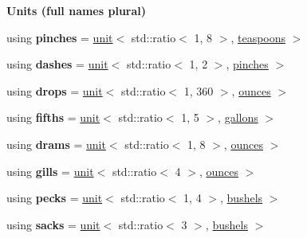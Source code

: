 \begin{Indent}{\bf Units (full names plural)}
\begin{DoxyCompactItemize}
\item 
\hypertarget{namespaceunits_1_1volume_a53a5ccb441ebec5eb3d1f1ede47b07ac}{}using {\bfseries pinches} = \hyperlink{structunits_1_1unit}{unit}$<$ std\+::ratio$<$ 1, 8 $>$, \hyperlink{structunits_1_1unit}{teaspoons} $>$\label{namespaceunits_1_1volume_a53a5ccb441ebec5eb3d1f1ede47b07ac}

\item 
\hypertarget{namespaceunits_1_1volume_a3c228a578ec1bf65da881bb35a3cde75}{}using {\bfseries dashes} = \hyperlink{structunits_1_1unit}{unit}$<$ std\+::ratio$<$ 1, 2 $>$, \hyperlink{structunits_1_1unit}{pinches} $>$\label{namespaceunits_1_1volume_a3c228a578ec1bf65da881bb35a3cde75}

\item 
\hypertarget{namespaceunits_1_1volume_a20e6934a29bbacdca7ef2802830ab91c}{}using {\bfseries drops} = \hyperlink{structunits_1_1unit}{unit}$<$ std\+::ratio$<$ 1, 360 $>$, \hyperlink{structunits_1_1unit}{ounces} $>$\label{namespaceunits_1_1volume_a20e6934a29bbacdca7ef2802830ab91c}

\item 
\hypertarget{namespaceunits_1_1volume_a561c4634b38d57cb72b90a3f431df29f}{}using {\bfseries fifths} = \hyperlink{structunits_1_1unit}{unit}$<$ std\+::ratio$<$ 1, 5 $>$, \hyperlink{structunits_1_1unit}{gallons} $>$\label{namespaceunits_1_1volume_a561c4634b38d57cb72b90a3f431df29f}

\item 
\hypertarget{namespaceunits_1_1volume_a8e55a2f0dc7dbb6e8b6f47ca93de9417}{}using {\bfseries drams} = \hyperlink{structunits_1_1unit}{unit}$<$ std\+::ratio$<$ 1, 8 $>$, \hyperlink{structunits_1_1unit}{ounces} $>$\label{namespaceunits_1_1volume_a8e55a2f0dc7dbb6e8b6f47ca93de9417}

\item 
\hypertarget{namespaceunits_1_1volume_a05e82fee9564b2b499f655bc55b321ee}{}using {\bfseries gills} = \hyperlink{structunits_1_1unit}{unit}$<$ std\+::ratio$<$ 4 $>$, \hyperlink{structunits_1_1unit}{ounces} $>$\label{namespaceunits_1_1volume_a05e82fee9564b2b499f655bc55b321ee}

\item 
\hypertarget{namespaceunits_1_1volume_ad4f7aaf17f9c4764b097e4e6c9e4e72d}{}using {\bfseries pecks} = \hyperlink{structunits_1_1unit}{unit}$<$ std\+::ratio$<$ 1, 4 $>$, \hyperlink{structunits_1_1unit}{bushels} $>$\label{namespaceunits_1_1volume_ad4f7aaf17f9c4764b097e4e6c9e4e72d}

\item 
\hypertarget{namespaceunits_1_1volume_aed9653007fb3d76d74fd38e46ff00c7b}{}using {\bfseries sacks} = \hyperlink{structunits_1_1unit}{unit}$<$ std\+::ratio$<$ 3 $>$, \hyperlink{structunits_1_1unit}{bushels} $>$\label{namespaceunits_1_1volume_aed9653007fb3d76d74fd38e46ff00c7b}


\end{DoxyCompactItemize}
\end{Indent}
